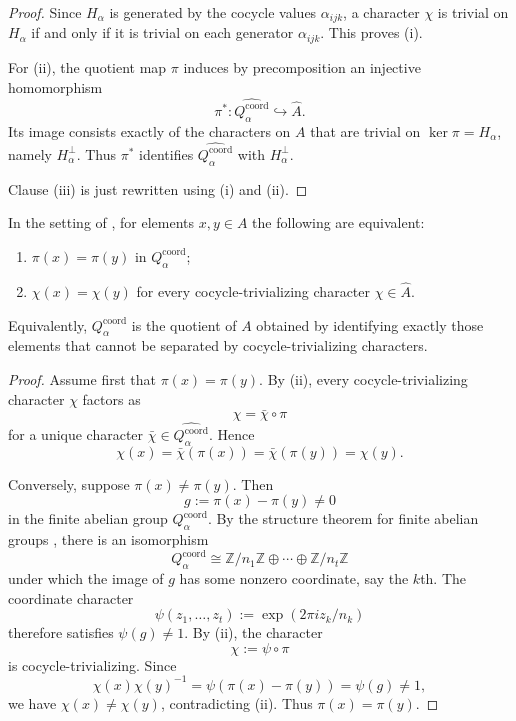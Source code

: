 \begin{proof}
Since $H_\alpha$ is generated by the cocycle values $\alpha_{ijk}$, a character $\chi$ is trivial on $H_\alpha$ if and only if it is trivial on each generator $\alpha_{ijk}$. This proves (i).

For (ii), the quotient map $\pi$ induces by precomposition an injective homomorphism
\[
\pi^*:\widehat{Q_{\alpha}^{\mathrm{coord}}}\hookrightarrow \widehat A.
\]
Its image consists exactly of the characters on $A$ that are trivial on $\ker\pi=H_\alpha$, namely $H_\alpha^\perp$. Thus $\pi^*$ identifies $\widehat{Q_{\alpha}^{\mathrm{coord}}}$ with $H_\alpha^\perp$.

Clause \textup{(iii)} is just  rewritten using \textup{(i)} and \textup{(ii)}.
\end{proof}

\begin{corollary}\label{cor:visible-quotient-character-separation}
In the setting of , for elements $x,y\in A$ the following are equivalent:
\begin{enumerate}[label=(\roman*),nosep]
\item $\pi(x)=\pi(y)$ in $Q_{\alpha}^{\mathrm{coord}}$;
\item $\chi(x)=\chi(y)$ for every cocycle-trivializing character $\chi\in\widehat A$.
\end{enumerate}
Equivalently, $Q_{\alpha}^{\mathrm{coord}}$ is the quotient of $A$ obtained by identifying exactly those elements that cannot be separated by cocycle-trivializing characters.
\end{corollary}

\begin{proof}
Assume first that $\pi(x)=\pi(y)$. By (ii), every cocycle-trivializing character $\chi$ factors as
\[
\chi=\bar\chi\circ\pi
\]
for a unique character $\bar\chi\in\widehat{Q_{\alpha}^{\mathrm{coord}}}$. Hence
\[
\chi(x)=\bar\chi(\pi(x))=\bar\chi(\pi(y))=\chi(y).
\]

Conversely, suppose $\pi(x)\neq\pi(y)$. Then
\[
g:=\pi(x)-\pi(y)\neq 0
\]
in the finite abelian group $Q_{\alpha}^{\mathrm{coord}}$. By the structure theorem for finite abelian groups \cite{DummitFoote2004}, there is an isomorphism
\[
Q_{\alpha}^{\mathrm{coord}}\cong \mathbb Z/n_1\mathbb Z\oplus\cdots\oplus \mathbb Z/n_t\mathbb Z
\]
under which the image of $g$ has some nonzero coordinate, say the $k$th. The coordinate character
\[
\psi(z_1,\dots,z_t):=\exp(2\pi i z_k/n_k)
\]
therefore satisfies $\psi(g)\neq 1$. By (ii), the character
\[
\chi:=\psi\circ\pi
\]
is cocycle-trivializing. Since
\[
\chi(x)\chi(y)^{-1}=\psi(\pi(x)-\pi(y))=\psi(g)\neq 1,
\]
we have $\chi(x)\neq\chi(y)$, contradicting (ii). Thus $\pi(x)=\pi(y)$.
\end{proof}

